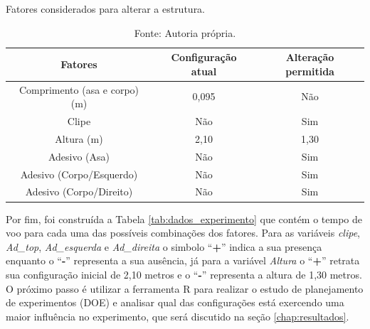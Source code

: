 \begin{table}[H]
  \caption{Fatores considerados para alterar a estrutura.}
  \centering
  \begin{tabular}{|c|c|c|}
  \hline
  \rowcolor[HTML]{EFEFEF} 
  \textbf{Fatores}              & \textbf{Configuração atual} & \textbf{Alteração permitida} \\ \hline
  Comprimento (asa e corpo) (m) & 0,095                       & Não                          \\ \hline
  \rowcolor[HTML]{EFEFEF} 
  Clipe                         & Não                         & Sim                          \\ \hline
  \rowcolor[HTML]{FFFFFF} 
  Altura (m)                    & 2,10                        & 1,30                         \\ \hline
  \rowcolor[HTML]{EFEFEF} 
  Adesivo (Asa)                 & Não                         & Sim                          \\ \hline
  \rowcolor[HTML]{FFFFFF} 
  Adesivo (Corpo/Esquerdo)         & Não                         & Sim                          \\ \hline
  \rowcolor[HTML]{EFEFEF} 
  Adesivo (Corpo/Direito)          & Não                         & Sim                          \\ \hline
  \end{tabular}
  \caption*{Fonte: Autoria própria.}
  \label{tab:fatores}
  \end{table}

Por fim, foi construída a Tabela \ref{tab:dados_experimento} que contém o tempo de voo para cada uma das possíveis combinações dos fatores. Para as variáveis \textit{clipe}, \textit{Ad\_top}, \textit{Ad\_esquerda} e \textit{Ad\_direita} o simbolo ``\textbf{+}'' indica a sua presença enquanto o ``\textbf{-}'' representa a sua ausência, já para a variável \textit{Altura} o ``\textbf{+}'' retrata sua configuração inicial de 2,10 metros e o ``\textbf{-}'' representa a altura de 1,30 metros. O próximo passo é utilizar a ferramenta R para realizar o estudo de planejamento de experimentos (\ac{DOE}) e analisar qual das configurações está exercendo uma maior influência no experimento, que será discutido na seção \ref{chap:resultados}.



